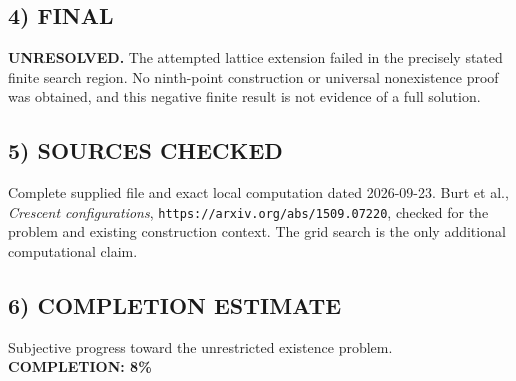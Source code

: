 \subsection*{4) FINAL}
\textbf{UNRESOLVED.} The attempted lattice extension failed in the precisely stated finite search region. No ninth-point construction or universal nonexistence proof was obtained, and this negative finite result is not evidence of a full solution.
\subsection*{5) SOURCES CHECKED}
Complete supplied file and exact local computation dated 2026-09-23. Burt et al., \emph{Crescent configurations}, \texttt{https://arxiv.org/abs/1509.07220}, checked for the problem and existing construction context. The grid search is the only additional computational claim.
\subsection*{6) COMPLETION ESTIMATE}
Subjective progress toward the unrestricted existence problem.
\textbf{COMPLETION: 8\%}
